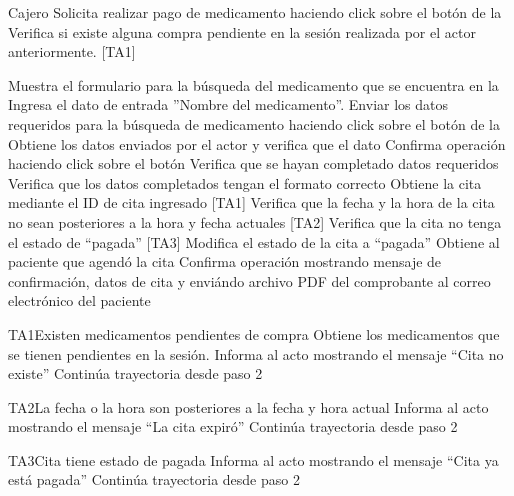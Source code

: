 \begin{UCtrayectoria}{Cajero}
		\UCpaso[\UCactor] Solicita realizar pago de medicamento haciendo click sobre el botón  de la 
    \UCpaso Verifica si existe alguna compra pendiente en la sesión realizada por el actor anteriormente. [TA1]
    
    \UCpaso Muestra el formulario para la búsqueda del medicamento que se encuentra en la 
		\UCpaso[\UCactor] Ingresa el dato de entrada ''Nombre del medicamento''.
    \UCpaso[\UCactor] Enviar los datos requeridos para la búsqueda de medicamento haciendo click sobre el botón  de la 
		\UCpaso Obtiene los datos enviados por el actor y verifica que el dato 
		\UCpaso[\UCactor] Confirma operación haciendo click sobre el botón 
		\UCpaso Verifica que se hayan completado datos requeridos
		\UCpaso Verifica que los datos completados tengan el formato correcto
		\UCpaso Obtiene la cita mediante el ID de cita ingresado [TA1]
		\UCpaso Verifica que la fecha y la hora de la cita no sean posteriores a la hora y fecha actuales [TA2]
		\UCpaso Verifica que la cita no tenga el estado de ``pagada'' [TA3]
		\UCpaso Modifica el estado de la cita a ``pagada''
		\UCpaso Obtiene al paciente que agendó la cita 
		\UCpaso Confirma operación mostrando mensaje de confirmación, datos de cita y enviándo archivo PDF del comprobante  al correo electrónico del paciente
\end{UCtrayectoria}

\begin{UCtrayectoriaA}{TA1}{Existen medicamentos pendientes de compra}
  \UCpaso Obtiene los medicamentos que se tienen pendientes en la sesión.
	\UCpaso Informa al acto mostrando el mensaje ``Cita no existe''
	\UCpaso Continúa trayectoria desde paso 2
	
\end{UCtrayectoriaA}
	
\begin{UCtrayectoriaA}{TA2}{La fecha o la hora son posteriores a la fecha y hora actual}
	\UCpaso Informa al acto mostrando el mensaje ``La cita expiró''
	\UCpaso Continúa trayectoria desde paso 2
	
\end{UCtrayectoriaA}

\begin{UCtrayectoriaA}{TA3}{Cita tiene estado de pagada}
	\UCpaso Informa al acto mostrando el mensaje ``Cita ya está pagada''
	\UCpaso Continúa trayectoria desde paso 2
	
\end{UCtrayectoriaA}
